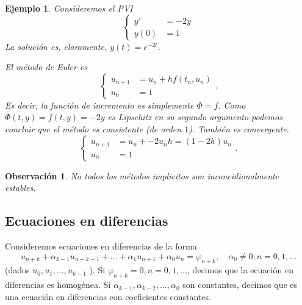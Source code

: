 \documentclass[11pt,letterpaper]{report}
\newtheorem{example}{Ejemplo}
\newtheorem{remark}{Observación}
\renewcommand\phi\varphi
\begin{document}
\begin{example}
  Consideremos el PVI
  \begin{equation}
    \left\{
    \begin{aligned}
      y' &= -2y \\
      y(0) &= 1
    \end{aligned}
    \right.
  \end{equation}
  La solución es, claramente, $y(t)=e^{-2t}$.

  El método de Euler es
  \begin{equation}
    \left\{
    \begin{aligned}
      u_{n+1} &= u_n + hf(t_n,u_n) \\
      u_0 &= 1
    \end{aligned}
    \right.
  .\end{equation}
  Es decir, la función de incremento es simplemente $\Phi=f$.
  Como $\Phi(t,y)=f(t,y)=-2y$ es Lipschitz en su segundo argumento
  podemos concluir que el método es consistente (de orden $1$).
  También es convergente.
  \begin{equation}
    \left\{
    \begin{aligned}
      u_{n+1} &= u_n + -2u_nh = (1-2h)u_n \\
      u_0 &= 1
    \end{aligned}
    \right.
  .\end{equation}
  

\end{example}

\begin{remark}
  No todos los métodos implicitos son inconcidionalmente estables.
\end{remark}

\subsection{Ecuaciones en diferencias }

Consideremos ecuaciones en diferencias de la forma
\begin{equation}\label{eq:ec_diferencias}
  u_{n+k} + \alpha_{k-1}u_{n+k-1}
  + \dots +
  \alpha_1 u_{n+1}+\alpha_0u_n
  =
  \phi_{n+k},
  \quad \alpha_0 \neq 0; n=0,1,\dots
\end{equation}
(dados $u_0,u_1,\dots,u_{k-1}$ ).
Si $\phi_{n+k}=0,n=0,1,\dots$, decimos que la ecuación en diferencias
es homogénea. Si $\alpha_{k-1},\alpha_{k-2},\dots,\alpha_0$ son
constantes, decimos que es una ecuación en diferencias con
coeficientes constantes.
\end{document}
